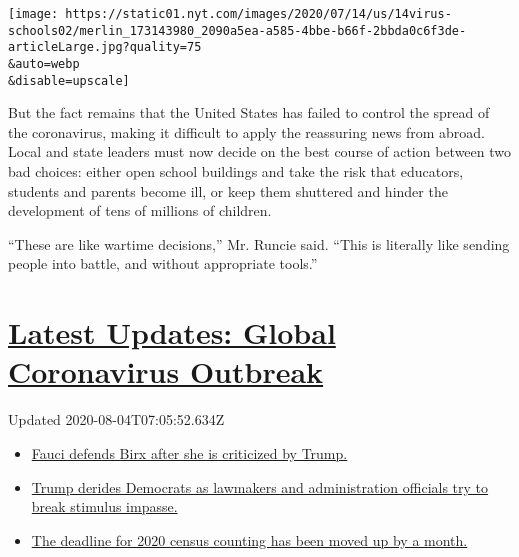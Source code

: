 \texttt{[image: https://static01.nyt.com/images/2020/07/14/us/14virus-schools02/merlin\_173143980\_2090a5ea-a585-4bbe-b66f-2bbda0c6f3de-articleLarge.jpg?quality=75\\\&auto=webp\\\&disable=upscale]}

But the fact remains that the United States has failed to control the
spread of the coronavirus, making it difficult to apply the reassuring
news from abroad. Local and state leaders must now decide on the best
course of action between two bad choices: either open school buildings
and take the risk that educators, students and parents become ill, or
keep them shuttered and hinder the development of tens of millions of
children.

``These are like wartime decisions,'' Mr. Runcie said. ``This is
literally like sending people into battle, and without appropriate
tools.''

\hypertarget{latest-updates-global-coronavirus-outbreak}{%
\section{\texorpdfstring{\href{https://www.nytimes.com/2020/08/03/world/coronavirus-covid-19.html?action=click\&pgtype=Article\&state=default\&region=MAIN_CONTENT_1\&context=storylines_live_updates}{Latest
Updates: Global Coronavirus
Outbreak}}{Latest Updates: Global Coronavirus Outbreak}}\label{latest-updates-global-coronavirus-outbreak}}

Updated 2020-08-04T07:05:52.634Z

\begin{itemize}
\tightlist
\item
  \href{https://www.nytimes.com/2020/08/03/world/coronavirus-covid-19.html?action=click\&pgtype=Article\&state=default\&region=MAIN_CONTENT_1\&context=storylines_live_updates\#link-4547638f}{Fauci
  defends Birx after she is criticized by Trump.}
\item
  \href{https://www.nytimes.com/2020/08/03/world/coronavirus-covid-19.html?action=click\&pgtype=Article\&state=default\&region=MAIN_CONTENT_1\&context=storylines_live_updates\#link-15e7f995}{Trump
  derides Democrats as lawmakers and administration officials try to
  break stimulus impasse.}
\item
  \href{https://www.nytimes.com/2020/08/03/world/coronavirus-covid-19.html?action=click\&pgtype=Article\&state=default\&region=MAIN_CONTENT_1\&context=storylines_live_updates\#link-e5a2cda}{The
  deadline for 2020 census counting has been moved up by a month.}
\end{itemize}


